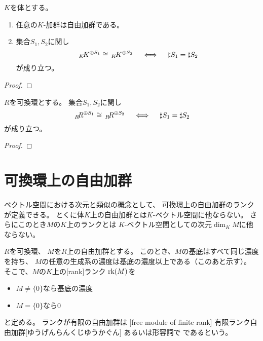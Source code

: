 \documentclass[report]{jlreq}
\begin{document}
\begin{theorem}[体上の加群の性質]
    $K$を体とする。
    \begin{enumerate}
        \item 任意の$K$-加群は自由加群である。
        \item 集合$S_1, S_2$に関し
            \begin{equation}
                \,{}_{K}\! K^{\oplus S_1} \cong \,{}_{K}\! K^{\oplus S_2}
                \quad \iff \quad
                \sharp S_1 = \sharp S_2
            \end{equation}
            が成り立つ。
    \end{enumerate}
\end{theorem}

\begin{proof}
    \TODO{}
\end{proof}

\begin{theorem}[可換環上の加群の性質]
    $R$を可換環とする。
    集合$S_1, S_2$に関し
    \begin{equation}
        \,{}_{R}\! R^{\oplus S_1} \cong \,{}_{R}\! R^{\oplus S_2}
        \quad \iff \quad
        \sharp S_1 = \sharp S_2
    \end{equation}
    が成り立つ。
\end{theorem}

\begin{proof}
    \TODO{}
\end{proof}

%
\section{可換環上の自由加群}

ベクトル空間における次元と類似の概念として、
可換環上の自由加群のランクが定義できる。
とくに体$K$上の自由加群とは$K$-ベクトル空間に他ならない。
さらにこのとき$M$の$K$上のランクとは
$K$-ベクトル空間としての次元$\dim_K M$に他ならない。

\begin{definition}[自由加群のランク]
    $R$を可換環、
    $M$を$R$上の自由加群とする。
    このとき、$M$の基底はすべて同じ濃度を持ち、
    $M$の任意の生成系の濃度は基底の濃度以上である（このあと示す）。
    そこで、$M$の$K$上の[rank]{ランク} $\operatorname{rk}(M)$を
    \begin{itemize}
        \item $M \neq \{0\}$なら基底の濃度
        \item $M = \{0\}$なら$0$
    \end{itemize}
    と定める。
    ランクが有限の自由加群は
    [free module of finite rank]
    {有限ランク自由加群}[ゆうげんらんくじゆうかぐん]
    あるいは形容詞で
    であるという。
\end{definition}
\end{document}
